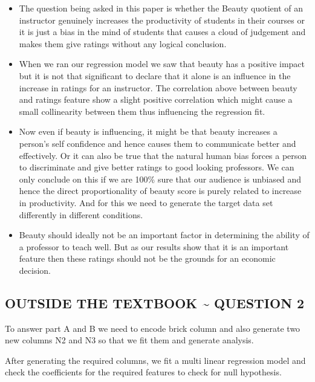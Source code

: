 \documentclass[
]{article}
\begin{document}
\begin{itemize}
\item
  The question being asked in this paper is whether the Beauty quotient
  of an instructor genuinely increases the productivity of students in
  their courses or it is just a bias in the mind of students that causes
  a cloud of judgement and makes them give ratings without any logical
  conclusion.
\item
  When we ran our regression model we saw that beauty has a positive
  impact but it is not that significant to declare that it alone is an
  influence in the increase in ratings for an instructor. The
  correlation above between beauty and ratings feature show a slight
  positive correlation which might cause a small collinearity between
  them thus influencing the regression fit.
\item
  Now even if beauty is influencing, it might be that beauty increases a
  person's self confidence and hence causes them to communicate better
  and effectively. Or it can also be true that the natural human bias
  forces a person to discriminate and give better ratings to good
  looking professors. We can only conclude on this if we are 100\% sure
  that our audience is unbiased and hence the direct proportionality of
  beauty score is purely related to increase in productivity. And for
  this we need to generate the target data set differently in different
  conditions.
\item
  Beauty should ideally not be an important factor in determining the
  ability of a professor to teach well. But as our results show that it
  is an important feature then these ratings should not be the grounds
  for an economic decision.
\end{itemize}

\hypertarget{outside-the-textbook-question-2}{%
\subsection{OUTSIDE THE TEXTBOOK \textasciitilde{} QUESTION
2}\label{outside-the-textbook-question-2}}

To answer part A and B we need to encode brick column and also generate
two new columns N2 and N3 so that we fit them and generate analysis.

After generating the required columns, we fit a multi linear regression
model and check the coefficients for the required features to check for
null hypothesis.
\end{document}
